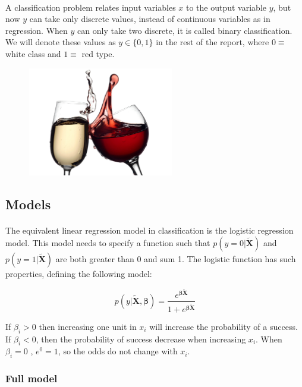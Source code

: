 \documentclass[10pt]{article}
\begin{document}
\paragraph*{}
A classification problem relates input variables $x$ to the output variable $y$, but now $y$ can take only discrete values, instead of continuous variables as in regression. When $y$ can only take two discrete, it is called binary classification. We will denote these values as $y \in \{0, 1\}$ in the rest of the report, where $0 \equiv$ white class and $1 \equiv$ red type.

\begin{figure}[H]
	\centering
	\includegraphics[width=2.5in]{figures/wines.jpg} 
\end{figure}


\subsection{Models}

\paragraph*{}
The equivalent linear regression model in classification is the logistic regression model. This model needs to specify a function such that $p(y=0|\bm{\tilde{X}})$ and $p(y=1|\bm{\tilde{X}})$ are both greater than 0 and sum 1. The logistic function has such properties, defining the following model:

$$ p(y|\bm{\tilde{X}},\bm{\beta}) = \frac{e^{\bm{\beta} \bm{\tilde{X}}}}{1+e^{\bm{\beta} \bm{\tilde{X}}}} $$

If $\beta_i > 0$ then increasing one unit in $x_i$ will increase the probability of a success. If $\beta_i < 0$,
then the probability of success decrease when increasing $x_i$. When $\beta_i = 0$ , $e^0 = 1$, so the odds do not change with $x_i$.

\subsubsection{Full model}
\end{document}
